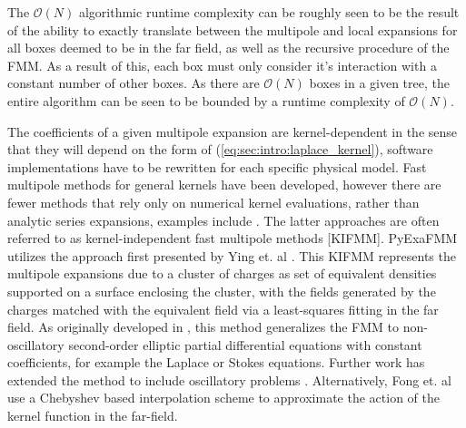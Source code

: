 \documentclass{IEEEcsmag}
\begin{document}
The $\mathcal{O}(N)$ algorithmic runtime complexity can be roughly seen to be the result of the ability to exactly translate between the multipole and local expansions for all boxes deemed to be in the far field, as well as the recursive procedure of the FMM. As a result of this, each box must only consider it's interaction with a constant number of other boxes. As there are $\mathcal{O}(N)$ boxes in a given tree, the entire algorithm can be seen to be bounded by a runtime complexity of $\mathcal{O}(N)$.

The coefficients of a given multipole expansion are kernel-dependent in the sense that they will depend on the form of (\ref{eq:sec:intro:laplace_kernel}), software implementations have to be rewritten for each specific physical model. Fast multipole methods for general kernels \cite{Gimbutas2003} have been developed, however there are fewer methods that rely only on numerical kernel evaluations, rather than analytic series expansions, examples include \cite{Fong2009, Ying2004,Martinsson2007}. The latter approaches are often referred to as kernel-independent fast multipole methods [KIFMM]. PyExaFMM utilizes the approach first presented by Ying et. al \cite{Ying2004}. This KIFMM represents the multipole expansions due to a cluster of charges as set of equivalent densities supported on a surface enclosing the cluster, with the fields generated by the charges matched with the equivalent field via a least-squares fitting in the far field. As originally developed in \cite{Ying2004}, this method generalizes the FMM to non-oscillatory second-order elliptic partial differential equations with constant coefficients, for example the Laplace or Stokes equations. Further work has extended the method to include oscillatory problems \cite{Engquist2007}. Alternatively, Fong et. al \cite{Fong2009} use a Chebyshev based interpolation scheme to approximate the action of the kernel function in the far-field.
\end{document}

